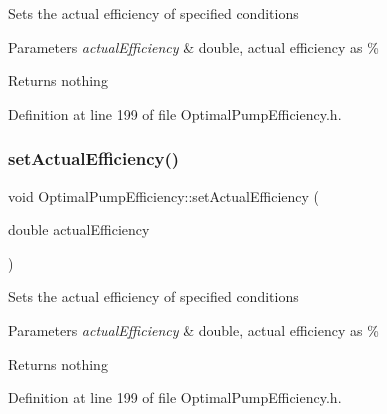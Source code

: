 Sets the actual efficiency of specified conditions


\begin{DoxyParams}{Parameters}
{\em actual\+Efficiency} & double, actual efficiency as \%\\
\hline
\end{DoxyParams}
\begin{DoxyReturn}{Returns}
nothing 
\end{DoxyReturn}


Definition at line 199 of file Optimal\+Pump\+Efficiency.\+h.

\mbox{\label{class_optimal_pump_efficiency_a539b20c53c7ba6a5983a60d74be4ac9e}} 
\subsubsection{\texorpdfstring{set\+Actual\+Efficiency()}{setActualEfficiency()}\hspace{0.1cm}{\footnotesize\ttfamily [2/3]}}
{\footnotesize\ttfamily void Optimal\+Pump\+Efficiency\+::set\+Actual\+Efficiency (\begin{DoxyParamCaption}\item[{double}]{actual\+Efficiency }\end{DoxyParamCaption})\hspace{0.3cm}{\ttfamily [inline]}}

Sets the actual efficiency of specified conditions


\begin{DoxyParams}{Parameters}
{\em actual\+Efficiency} & double, actual efficiency as \%\\
\hline
\end{DoxyParams}
\begin{DoxyReturn}{Returns}
nothing 
\end{DoxyReturn}


Definition at line 199 of file Optimal\+Pump\+Efficiency.\+h.

\mbox{\label{class_optimal_pump_efficiency_a539b20c53c7ba6a5983a60d74be4ac9e}} 
